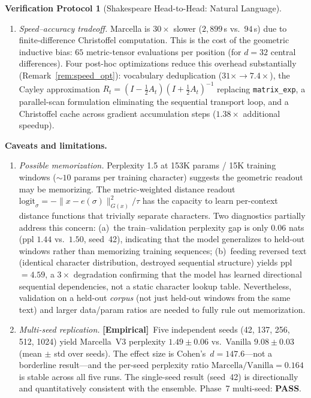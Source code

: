 \documentclass[11pt,a4paper]{article}
\theoremstyle{definition}
\newtheorem{protocol}[theorem]{Verification Protocol}
\theoremstyle{remark}
\newcommand{\statusempirical}{\textcolor{purple!70!black}{\textbf{[Empirical]}}}
\begin{document}
\begin{protocol}[Shakespeare Head-to-Head: Natural Language]
\begin{enumerate}[nosep]
  \item \emph{Speed--accuracy tradeoff.} Marcella is $30\times$ 
  slower ($2{,}899$\,s vs.\ $94$\,s) due to finite-difference 
  Christoffel computation. This is the cost of the geometric 
  inductive bias: $65$ metric-tensor evaluations per position 
  (for $d = 32$ central differences). Four post-hoc optimizations
  reduce this overhead substantially 
  (Remark~\ref{rem:speed_opt}):
  vocabulary deduplication ($31\times \to 7.4\times$),
  the Cayley approximation 
  $R_t = (I - \tfrac{1}{2}A_t)(I + \tfrac{1}{2}A_t)^{-1}$
  replacing \texttt{matrix\_exp}, a parallel-scan
  formulation eliminating the sequential transport loop, and
  a Christoffel cache across gradient accumulation steps
  ($1.38\times$ additional speedup).
\end{enumerate}

\textbf{Caveats and limitations.}
\begin{enumerate}[nosep]
  \item \emph{Possible memorization.} Perplexity 1.5 at 153K 
  params / 15K training windows (${\sim}10$ params per training 
  character) suggests the geometric readout may be memorizing. 
  The metric-weighted distance readout 
  $\mathrm{logit}_\sigma = -\|x - e(\sigma)\|^2_{G(x)}/\tau$ 
  has the capacity to learn per-context distance functions that 
  trivially separate characters. Two diagnostics partially 
  address this concern: (a)~the train--validation perplexity 
  gap is only $0.06$ nats (ppl $1.44$ vs.\ $1.50$, seed~42), 
  indicating that the model generalizes to held-out windows 
  rather than memorizing training sequences; (b)~feeding 
  reversed text (identical character distribution, destroyed 
  sequential structure) yields ppl~$= 4.59$, a $3\times$ 
  degradation confirming that the model has learned directional 
  sequential dependencies, not a static character lookup table. 
  Nevertheless, validation on a held-out \emph{corpus} (not 
  just held-out windows from the same text) and larger 
  data/param ratios are needed to fully rule out memorization.
  
  \item \emph{Multi-seed replication.} \statusempirical\ Five 
  independent seeds (42, 137, 256, 512, 1024) yield 
  Marcella~V3 perplexity $1.49 \pm 0.06$ vs.\ Vanilla 
  $9.08 \pm 0.03$ (mean $\pm$ std over seeds). The effect 
  size is Cohen's~$d = 147.6$---not a borderline result---and 
  the per-seed perplexity ratio 
  $\text{Marcella}/\text{Vanilla} = 0.164$ is stable across 
  all five runs. The single-seed result (seed~42) is 
  directionally and quantitatively consistent with the 
  ensemble. Phase~7 multi-seed: \textbf{PASS}.


\end{enumerate}
\end{protocol}
\end{document}
